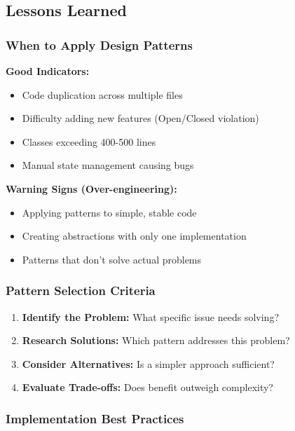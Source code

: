 \documentclass[11pt,a4paper]{article}
\begin{document}
\subsection{Lessons Learned}

\subsubsection{When to Apply Design Patterns}

\textbf{Good Indicators:}
\begin{itemize}
    \item Code duplication across multiple files
    \item Difficulty adding new features (Open/Closed violation)
    \item Classes exceeding 400-500 lines
    \item Manual state management causing bugs
\end{itemize}

\textbf{Warning Signs (Over-engineering):}
\begin{itemize}
    \item Applying patterns to simple, stable code
    \item Creating abstractions with only one implementation
    \item Patterns that don't solve actual problems
\end{itemize}

\subsubsection{Pattern Selection Criteria}

\begin{enumerate}
    \item \textbf{Identify the Problem:} What specific issue needs solving?
    \item \textbf{Research Solutions:} Which pattern addresses this problem?
    \item \textbf{Consider Alternatives:} Is a simpler approach sufficient?
    \item \textbf{Evaluate Trade-offs:} Does benefit outweigh complexity?
\end{enumerate}

\subsubsection{Implementation Best Practices}
\end{document}
